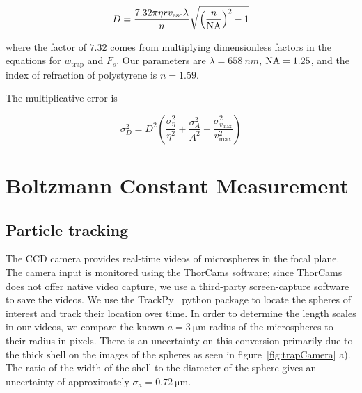 \documentclass[aps,prb,twocolumn,superscriptaddress,floatfix,longbibliography,citeautoscript]{revtex4-2}
\begin{document}
$$D = \frac{7.32 \pi \eta r v_{\text{esc}} \lambda}{n} \sqrt{\left( \frac{n}{\mathrm{NA}} \right)^2 - 1}$$

where the factor of $7.32$ comes from multiplying dimensionless factors in the equations for $w_{\text{trap}}$ and $F_s$.
Our parameters are $\lambda = \SI{658}{nm}$, $\mathrm{NA} = 1.25$, and the index of refraction of polystyrene is $n = 1.59$. 

The multiplicative error is 

$$ \sigma_D^2 = D^2 \left( \frac{\sigma_\eta^2}{\eta^2} + \frac{\sigma_A^2}{A^2} + \frac{\sigma_{v_{\max}}^2}{v_{\max}^2} \right) $$


\section{Boltzmann Constant Measurement}
\subsection{Particle tracking}
The CCD camera provides real-time videos of microspheres in the focal plane. 
The camera input is monitored using the ThorCams software; since ThorCams does not offer native 
video capture, we use a third-party screen-capture software to save the videos. 
We use the TrackPy~\cite{trackpy} python package to locate the spheres of interest and track their location over time. In order to determine the length scales in our videos, we compare the known $a=\SI{3}{\micro\meter}$ radius of the microspheres to their radius in pixels. There is an uncertainty on this conversion primarily due to the thick shell on the images of the spheres as seen in figure~\ref{fig:trapCamera} a). The ratio of the width of the shell to the diameter of the sphere gives an uncertainty of approximately $\sigma_a = \SI{0.72}{\micro\meter}$. 
\end{document}
